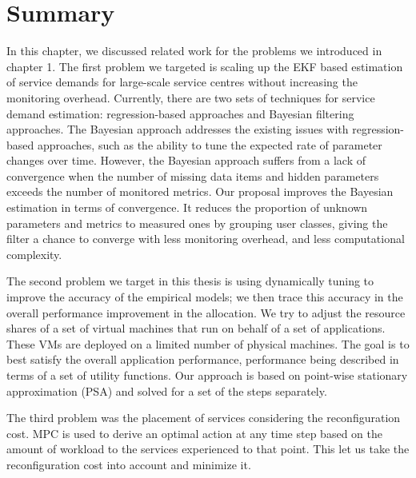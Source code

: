   \section{Summary}   
 In this chapter, we discussed related work for the problems we introduced in chapter 1. The first problem we targeted is scaling up the EKF based estimation of service demands for large-scale service centres without increasing the monitoring overhead. Currently, there are two sets of techniques for service demand estimation:  regression-based approaches and Bayesian filtering approaches. The Bayesian approach addresses the existing issues with regression-based approaches, such as the ability to tune the expected rate of parameter changes over time.
 However, the Bayesian approach suffers from a lack of convergence when the number of missing data items and hidden parameters exceeds the number of monitored metrics. Our proposal improves the Bayesian estimation in terms of convergence. It reduces the proportion of unknown parameters and metrics to measured ones by grouping user classes, giving the filter a chance to converge with less monitoring overhead, and less computational complexity. 
 
 The second problem we target in this thesis is using dynamically tuning to improve the accuracy of the empirical models; we then trace this accuracy in the overall performance improvement in the allocation. We try to adjust the resource shares of a set of virtual machines that run on behalf of a set of applications. These VMs are deployed on a limited number of physical machines. The goal is to best satisfy the overall application performance, performance being described in terms of a set of utility functions. Our approach is based on point-wise stationary approximation (PSA) and solved for a set of the steps separately.
	   
	The third problem was the placement of services considering the reconfiguration cost. MPC is used to derive an optimal action at any time step based on the amount of workload to the services experienced to that point. This let us take the reconfiguration cost into account and minimize it.



